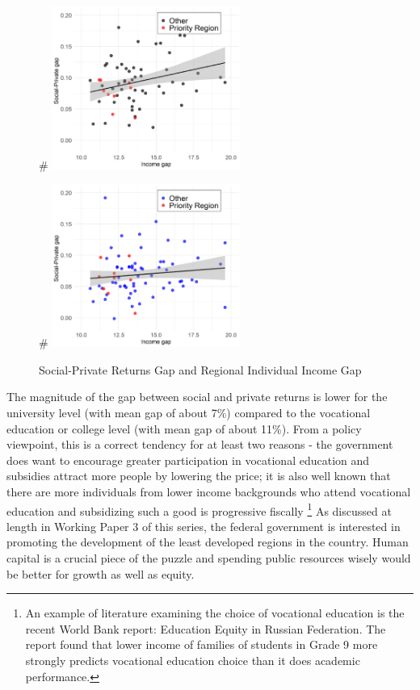 \documentclass[alpha-refs]{wiley-article-05g}
\begin{document}
\begin{figure}[htbp!]
	\begin{minipage}[b]{.5\linewidth}
		\centering
		#\hspace*{-0.2in}
		\includegraphics[width=175pt]{igap_c.png}
	\end{minipage}
	\hfill
	\begin{minipage}[b]{.5\linewidth}
		\centering
		#\hspace*{-0.2in}
		\includegraphics[width=175pt]{igap_u.png}
	\end{minipage}
	\caption{Social-Private Returns Gap and Regional Individual Income Gap}\label{fig:1.5}
\end{figure}

The magnitude of the gap between social and private returns is lower for the university level (with mean gap of about 7\%) compared to the vocational education or college level (with mean gap of about 11\%). From a policy viewpoint, this is a correct tendency for at least two reasons - the government does want to encourage greater participation in vocational education and subsidies attract more people by lowering the price; it is also well known that there are more individuals from lower income backgrounds who attend vocational education and subsidizing such a good is progressive fiscally \footnote{An example of literature examining the choice of vocational education is  the recent World Bank report: Education Equity in Russian Federation. The report found that lower income of families of students in Grade 9 more strongly predicts vocational education choice than it does academic performance.} As discussed at length in Working Paper 3 of this series, the federal government is interested in promoting the development of the least developed regions in the country. Human capital is a crucial piece of the puzzle and spending public resources wisely would be better for growth as well as equity.  
\end{document}
